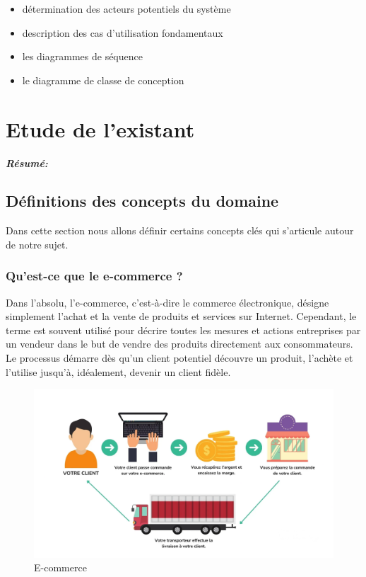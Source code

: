 \documentclass[a4paper, 12pt]{report}
\begin{document}
 \begin{itemize}
    \item détermination des acteurs potentiels du système
    \item description des cas d’utilisation fondamentaux
    \item les diagrammes de séquence
    \item le diagramme de classe de conception
\end{itemize}



\chapter{ Etude de l'existant }
\textit{\textbf{Résumé:} }
\setcounter{minitocdepth}{1}
\minitoc

\section{Définitions des concepts du domaine}
Dans cette section nous allons définir certains concepts clés qui s'articule autour de notre sujet.
\subsection{Qu’est-ce que le e-commerce ?}
Dans l’absolu, l’e-commerce, c’est-à-dire le commerce électronique, désigne simplement l’achat et la vente de produits et services sur Internet. Cependant, le terme est souvent utilisé pour décrire toutes les mesures et actions entreprises par un vendeur dans le but de vendre des produits directement aux consommateurs. Le processus démarre dès qu’un client potentiel découvre un produit, l’achète et l’utilise jusqu’à, idéalement, devenir un client fidèle.
\begin{figure}[H]
    \centering
    \includegraphics[width = 1\linewidth]{img/how-e-commerce.png}
    \caption{E-commerce}
\end{figure}
\end{document}
